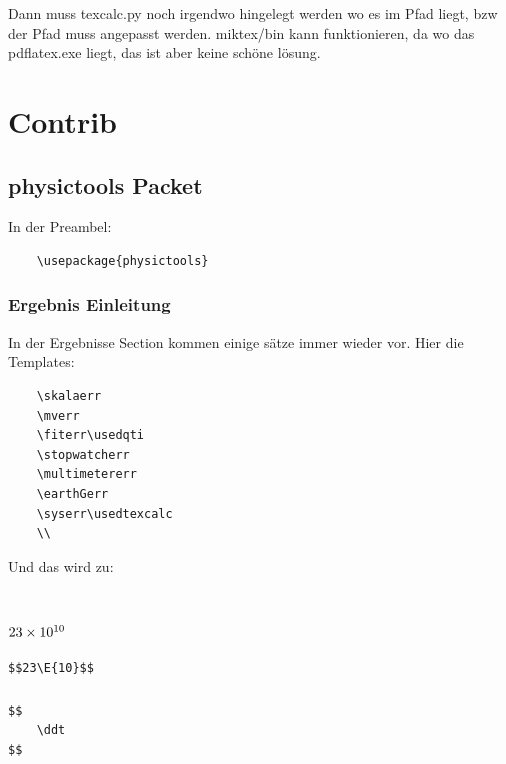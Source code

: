 \documentclass[a4paper]{article}
\begin{document}
Dann muss texcalc.py noch irgendwo hingelegt werden wo es im Pfad liegt, bzw 
der Pfad muss angepasst werden. miktex/bin kann funktionieren, da wo das pdflatex.exe 
liegt, das ist aber keine schöne lösung.\\ 

\section{Contrib}



\subsection{physictools Packet}

In der Preambel:

\begin{verbatim}
	\usepackage{physictools}
\end{verbatim}

\subsubsection{Ergebnis Einleitung}

In der Ergebnisse Section kommen einige sätze immer wieder vor. Hier die Templates: 

\begin{verbatim}
	\skalaerr
	\mverr
	\fiterr\usedqti
	\stopwatcherr
	\multimetererr
	\earthGerr
	\syserr\usedtexcalc
	\\
\end{verbatim}


Und das wird zu: \\

\skalaerr
\mverr
\fiterr\usedqti
\stopwatcherr
\multimetererr
\earthGerr
\syserr\usedtexcalc
\\


\subsubsection{$23 \times 10^{10}$}

\begin{verbatim}
$$23\E{10}$$
\end{verbatim}

\subsubsection{\ddt}

\begin{verbatim}
$$
	\ddt
$$
\end{verbatim}
\end{document}
